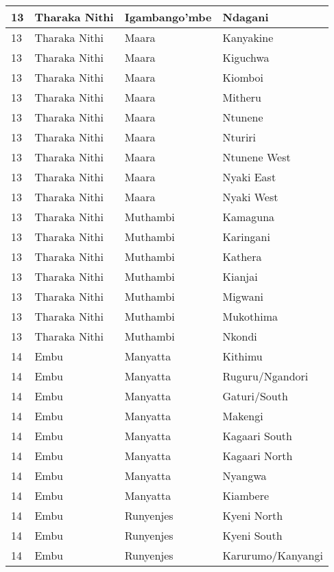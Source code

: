 \begin{table}[!ht]
\begin{tabular}{|l|l|l|l|}
        13 & Tharaka Nithi & Igambango’mbe & Ndagani \\ \hline
        13 & Tharaka Nithi & Maara & Kanyakine \\ \hline
        13 & Tharaka Nithi & Maara & Kiguchwa \\ \hline
        13 & Tharaka Nithi & Maara & Kiomboi \\ \hline
        13 & Tharaka Nithi & Maara & Mitheru \\ \hline
        13 & Tharaka Nithi & Maara & Ntunene \\ \hline
        13 & Tharaka Nithi & Maara & Nturiri \\ \hline
        13 & Tharaka Nithi & Maara & Ntunene West \\ \hline
        13 & Tharaka Nithi & Maara & Nyaki East \\ \hline
        13 & Tharaka Nithi & Maara & Nyaki West \\ \hline
        13 & Tharaka Nithi & Muthambi & Kamaguna \\ \hline
        13 & Tharaka Nithi & Muthambi & Karingani \\ \hline
        13 & Tharaka Nithi & Muthambi & Kathera \\ \hline
        13 & Tharaka Nithi & Muthambi & Kianjai \\ \hline
        13 & Tharaka Nithi & Muthambi & Migwani \\ \hline
        13 & Tharaka Nithi & Muthambi & Mukothima \\ \hline
        13 & Tharaka Nithi & Muthambi & Nkondi \\ \hline
        14 & Embu & Manyatta & Kithimu \\ \hline
        14 & Embu & Manyatta & Ruguru/Ngandori \\ \hline
        14 & Embu & Manyatta & Gaturi/South \\ \hline
        14 & Embu & Manyatta & Makengi \\ \hline
        14 & Embu & Manyatta & Kagaari South \\ \hline
        14 & Embu & Manyatta & Kagaari North \\ \hline
        14 & Embu & Manyatta & Nyangwa \\ \hline
        14 & Embu & Manyatta & Kiambere \\ \hline
        14 & Embu & Runyenjes & Kyeni North \\ \hline
        14 & Embu & Runyenjes & Kyeni South \\ \hline
        14 & Embu & Runyenjes & Karurumo/Kanyangi \\ \hline

\end{tabular}
\end{table}
